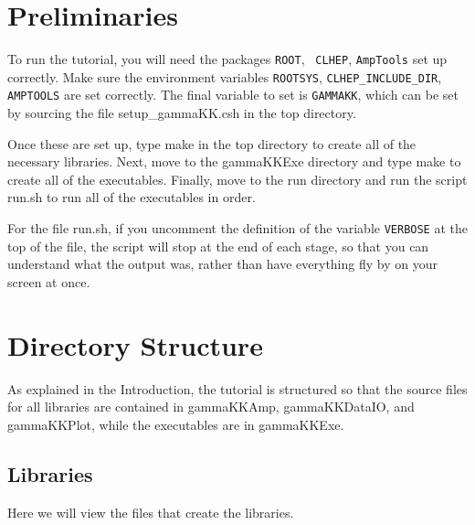 \documentclass[11pt]{article}
\begin{document}
\section{Preliminaries}

To run the tutorial, you will need the packages {\tt ROOT}, {\tt
  CLHEP}, {\tt AmpTools} set up correctly. Make sure the environment
variables {\tt ROOTSYS}, {\tt CLHEP\_INCLUDE\_DIR}, {\tt AMPTOOLS} are
set correctly. The final variable to set is {\tt GAMMAKK}, which can
be set by sourcing the file setup\_gammaKK.csh in the top directory.

Once these are set up, type make in the top directory to create all of
the necessary libraries. Next, move to the gammaKKExe directory and
type make to create all of the executables. Finally, move to the run
directory and run the script run.sh to run all of the executables in
order.

For the file run.sh, if you uncomment the definition of the variable
{\tt VERBOSE} at the top of the file, the script will stop at the end
of each stage, so that you can understand what the output was, rather
than have everything fly by on your screen at once.

\section{Directory Structure}

As explained in the Introduction, the tutorial is structured so that
the source files for all libraries are contained in gammaKKAmp,
gammaKKDataIO, and gammaKKPlot, while the executables are in
gammaKKExe.

\subsection{Libraries}
Here we will view the files that create the libraries.
\end{document}
